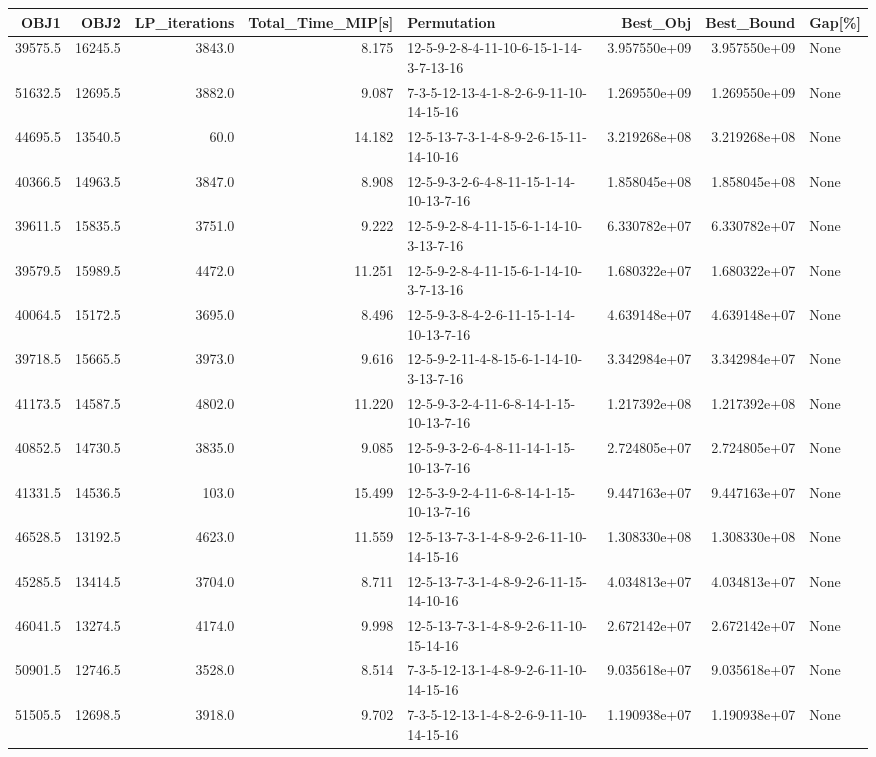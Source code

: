 \begin{tabular}{rrrrlrrl}
\toprule
    OBJ1 &     OBJ2 &  LP\_iterations &  Total\_Time\_MIP[s] &                             Permutation &      Best\_Obj &    Best\_Bound & Gap[\%] \\
\midrule
 39575.5 &  16245.5 &         3843.0 &              8.175 &  12-5-9-2-8-4-11-10-6-15-1-14-3-7-13-16 &  3.957550e+09 &  3.957550e+09 &   None \\
 51632.5 &  12695.5 &         3882.0 &              9.087 &  7-3-5-12-13-4-1-8-2-6-9-11-10-14-15-16 &  1.269550e+09 &  1.269550e+09 &   None \\
 44695.5 &  13540.5 &           60.0 &             14.182 &  12-5-13-7-3-1-4-8-9-2-6-15-11-14-10-16 &  3.219268e+08 &  3.219268e+08 &   None \\
 40366.5 &  14963.5 &         3847.0 &              8.908 &  12-5-9-3-2-6-4-8-11-15-1-14-10-13-7-16 &  1.858045e+08 &  1.858045e+08 &   None \\
 39611.5 &  15835.5 &         3751.0 &              9.222 &  12-5-9-2-8-4-11-15-6-1-14-10-3-13-7-16 &  6.330782e+07 &  6.330782e+07 &   None \\
 39579.5 &  15989.5 &         4472.0 &             11.251 &  12-5-9-2-8-4-11-15-6-1-14-10-3-7-13-16 &  1.680322e+07 &  1.680322e+07 &   None \\
 40064.5 &  15172.5 &         3695.0 &              8.496 &  12-5-9-3-8-4-2-6-11-15-1-14-10-13-7-16 &  4.639148e+07 &  4.639148e+07 &   None \\
 39718.5 &  15665.5 &         3973.0 &              9.616 &  12-5-9-2-11-4-8-15-6-1-14-10-3-13-7-16 &  3.342984e+07 &  3.342984e+07 &   None \\
 41173.5 &  14587.5 &         4802.0 &             11.220 &  12-5-9-3-2-4-11-6-8-14-1-15-10-13-7-16 &  1.217392e+08 &  1.217392e+08 &   None \\
 40852.5 &  14730.5 &         3835.0 &              9.085 &  12-5-9-3-2-6-4-8-11-14-1-15-10-13-7-16 &  2.724805e+07 &  2.724805e+07 &   None \\
 41331.5 &  14536.5 &          103.0 &             15.499 &  12-5-3-9-2-4-11-6-8-14-1-15-10-13-7-16 &  9.447163e+07 &  9.447163e+07 &   None \\
 46528.5 &  13192.5 &         4623.0 &             11.559 &  12-5-13-7-3-1-4-8-9-2-6-11-10-14-15-16 &  1.308330e+08 &  1.308330e+08 &   None \\
 45285.5 &  13414.5 &         3704.0 &              8.711 &  12-5-13-7-3-1-4-8-9-2-6-11-15-14-10-16 &  4.034813e+07 &  4.034813e+07 &   None \\
 46041.5 &  13274.5 &         4174.0 &              9.998 &  12-5-13-7-3-1-4-8-9-2-6-11-10-15-14-16 &  2.672142e+07 &  2.672142e+07 &   None \\
 50901.5 &  12746.5 &         3528.0 &              8.514 &  7-3-5-12-13-1-4-8-9-2-6-11-10-14-15-16 &  9.035618e+07 &  9.035618e+07 &   None \\
 51505.5 &  12698.5 &         3918.0 &              9.702 &  7-3-5-12-13-1-4-8-2-6-9-11-10-14-15-16 &  1.190938e+07 &  1.190938e+07 &   None \\
\bottomrule
\end{tabular}
